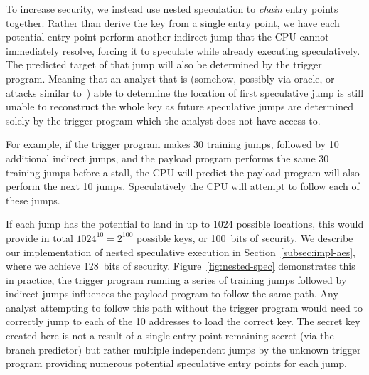To increase security, we instead use nested speculation to \emph{chain} entry
points together. Rather than derive the key from a single entry point, we have
each potential entry point perform another indirect jump that the CPU cannot
immediately resolve, forcing it to speculate while already executing
speculatively. The predicted target of that jump will also be determined by the
trigger program. Meaning that an analyst that is (somehow, possibly via oracle,
or attacks similar to~\cite{aciiccmez2007predicting}) able to determine the
location of first speculative jump is still unable to reconstruct the whole key
as future speculative jumps are determined solely by the trigger program which
the analyst does not have access to.

For example, if the trigger program makes 30 training jumps, followed by 10
additional indirect jumps, and the payload program performs the same 30 training
jumps before a stall, the CPU will predict the payload program will also perform
the next 10 jumps. Speculatively the CPU will attempt to follow each of these
jumps. 

If each jump has the potential to land in up to 1024 possible locations, this
would provide in total $1024^{10} = 2^{100}$ possible keys, or 100~bits of
security. We describe our implementation of nested speculative execution in
Section~\ref{subsec:impl-aes}, where we achieve 128~bits of security.
Figure~\ref{fig:nested-spec} demonstrates this in practice, the trigger program
running a series of training jumps followed by indirect jumps influences the
payload program to follow the same path. Any analyst attempting to follow this
path without the trigger program would need to correctly jump to each of the 10
addresses to load the correct key. The secret key created here is not a result
of a single entry point remaining secret (via the branch predictor) but rather
multiple independent jumps by the unknown trigger program providing numerous
potential speculative entry points for each jump.

\FigNestedSpec


\medskip


%
%



